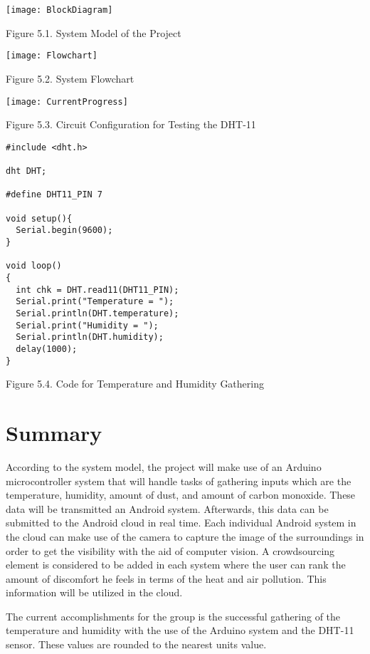 \texttt{[image: BlockDiagram]}

\begin{center}
Figure 5.1. System Model of the Project
\end{center}

\begin{center}
\texttt{[image: Flowchart]}
\end{center}




\begin{center}
Figure 5.2. System Flowchart
\end{center}

\texttt{[image: CurrentProgress]}

\begin{center}
Figure 5.3. Circuit Configuration for Testing the DHT-11
\end{center}







\begin{lstlisting}
#include <dht.h>

dht DHT;

#define DHT11_PIN 7

void setup(){
  Serial.begin(9600);
}

void loop()
{
  int chk = DHT.read11(DHT11_PIN);
  Serial.print("Temperature = ");
  Serial.println(DHT.temperature);
  Serial.print("Humidity = ");
  Serial.println(DHT.humidity);
  delay(1000);
}
\end{lstlisting}

\begin{center}
Figure 5.4. Code for Temperature and Humidity Gathering
\end{center}

\section{Summary}

According to the system model, the project will make use of an Arduino microcontroller system that will handle tasks of gathering inputs which are the temperature, humidity, amount of dust, and amount of carbon monoxide. These data will be transmitted an Android system. Afterwards, this data can be submitted  to the Android cloud in real time. Each individual Android system in the cloud can make use of the camera to capture the image of the surroundings in order to get the visibility with the aid of computer vision. A crowdsourcing element is considered to be added in each system where the user can rank the amount of discomfort he feels in terms of the heat and air pollution. This information will be utilized in the cloud.

The current accomplishments for the group is the successful gathering of the temperature and humidity with the use of the Arduino system and the DHT-11 sensor. These values are rounded to the nearest units value.